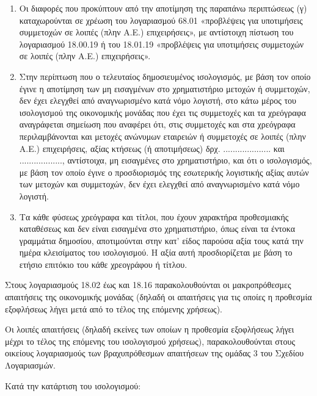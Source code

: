 \documentclass[A4,10pt,greek]{book}
\begin{document}
\begin{enumerate}
\item Οι διαφορές που προκύπτουν από την αποτίμηση της παραπάνω περιπτώσεως (γ) καταχωρούνται σε χρέωση του λογαριασμού 68.01 «προβλέψεις για υποτιμήσεις συμμετοχών σε λοιπές (πλην Α.Ε.) επιχειρήσεις», με αντίστοιχη πίστωση του λογαριασμού 18.00.19 ή του 18.01.19 «προβλέψεις για υποτιμήσεις συμμετοχών σε λοιπές (πλην Α.Ε.) επιχειρήσεις».

\item Στην περίπτωση που ο τελευταίος δημοσιευμένος ισολογισμός, με βάση τον οποίο έγινε η αποτίμηση των μη εισαγμένων στο χρηματιστήριο μετοχών ή συμμετοχών, δεν έχει ελεγχθεί από αναγνωρισμένο κατά νόμο λογιστή, στο κάτω μέρος του ισολογισμού της οικονομικής μονάδας που έχει τις συμμετοχές και τα χρεόγραφα αναγράφεται σημείωση που αναφέρει ότι, στις συμμετοχές και στα χρεόγραφα περιλαμβάνονται και μετοχές ανώνυμων εταιρειών ή συμμετοχές σε λοιπές (πλην Α.Ε.) επιχειρήσεις, αξίας κτήσεως (ή αποτιμήσεως) δρχ. ....................  και .................., αντίστοιχα, μη εισαγμένες στο χρηματιστήριο, και ότι ο ισολογισμός, με βάση τον οποίο έγινε ο προσδιορισμός της εσωτερικής λογιστικής αξίας αυτών των μετοχών και συμμετοχών, δεν έχει ελεγχθεί από αναγνωρισμένο κατά νόμο λογιστή.

\item Τα κάθε φύσεως χρεόγραφα και τίτλοι, που έχουν χαρακτήρα προθεσμιακής καταθέσεως και δεν είναι εισαγμένα στο χρηματιστήριο, όπως είναι τα έντοκα γραμμάτια δημοσίου, αποτιμούνται στην κατ' είδος παρούσα αξία τους κατά την ημέρα κλεισίματος του ισολογισμού. Η αξία αυτή προσδιορίζεται με βάση το ετήσιο επιτόκιο του κάθε χρεογράφου ή τίτλου.

\end{enumerate}

Στους λογαριασμούς 18.02 έως και 18.16 παρακολουθούνται οι μακροπρόθεσμες απαιτήσεις της οικονομικής μονάδας (δηλαδή οι απαιτήσεις για τις οποίες η προθεσμία εξοφλήσεως λήγει μετά από το τέλος της επόμενης χρήσεως).

Οι λοιπές απαιτήσεις (δηλαδή εκείνες των οποίων η προθεσμία εξοφλήσεως λήγει μέχρι το τέλος της επόμενης του ισολογισμού χρήσεως), παρακολουθούνται στους οικείους λογαριασμούς των βραχυπρόθεσμων απαιτήσεων της ομάδας 3 του Σχεδίου Λογαριασμών.

Κατά την κατάρτιση του ισολογισμού: 
\end{document}
